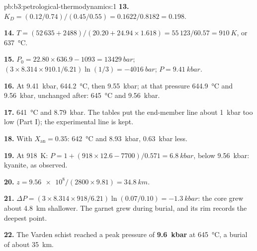 \begin{solution}{pb:b3:petrological-thermodynamics:1}
\textbf{13.} $K_D = (0.12/0.74)/(0.45/0.55) = 0.1622/0.8182 = 0.198$.

\textbf{14.} $T = (52\,635 + 2488)/(20.20 + 24.94\times1.618) = 55\,123/60.57
= \qty{910}{K}$, or \qty{637}{\celsius}.

\textbf{15.} $P_0 = 22.80\times636.9 - 1093 = \qty{13429}{bar}$; $(3\times8.314
\times910.1/6.21)\ln(1/3) = \qty{-4016}{bar}$; $P = \qty{9.41}{kbar}$.

\textbf{16.} At \qty{9.41}{kbar}, \qty{644.2}{\celsius}, then
\qty{9.55}{kbar}; at that pressure \qty{644.9}{\celsius} and
\qty{9.56}{kbar}, unchanged after: \qty{645}{\celsius} and
\qty{9.56}{kbar}.

\textbf{17.} \qty{641}{\celsius} and \qty{8.79}{kbar}. The tables put the
end-member line about \qty{1}{kbar} too low (Part I); the experimental line
is kept.

\textbf{18.} With $X_{\text{an}} = 0.35$: \qty{642}{\celsius} and
\qty{8.93}{kbar}, \qty{0.63}{kbar} less.

\textbf{19.} At \qty{918}{K}: $P = 1 + (918\times12.6 - 7700)/0.571 =
\qty{6.8}{kbar}$, below \qty{9.56}{kbar}: kyanite, as observed.

\textbf{20.} $z = \num{9.56e8}/(2800\times9.81) = \qty{34.8}{km}$.

\textbf{21.} $\Delta P = (3\times8.314\times918/6.21)\ln(0.07/0.10) =
\qty{-1.3}{kbar}$: the core grew about \qty{4.8}{km} shallower. The garnet
grew during burial, and its rim records the deepest point.

\textbf{22.} The Varden schist reached a peak pressure of
\textbf{\qty[text-series-to-math=true]{9.6}{kbar}} at
\qty{645}{\celsius}, a burial of about \qty{35}{km}.
\end{solution}
